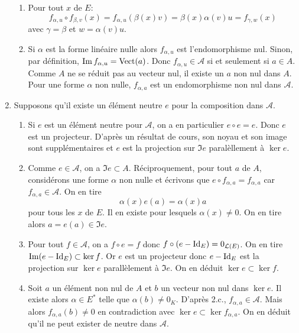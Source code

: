 \begin{enumerate}
\begin{enumerate}
 \item Pour tout $x$ de $E$:
\begin{displaymath}
 f_{\alpha, u} \circ f_{\beta, v}(x)
= f_{\alpha, u}( \beta(x) v) = \beta(x)\alpha(v) u = f_{\gamma, w}(x)
\end{displaymath}
avec $\gamma = \beta$ et $w=\alpha(v)u$.
\item Si $\alpha$ est la forme linéaire nulle alors $f_{\alpha, u}$ est l'endomorphisme nul. Sinon, par définition, $\operatorname{Im} f_{\alpha, u} = \operatorname{Vect}(a)$. Donc $f_{\alpha, u}\in\mathcal{A}$ si et seulement si $a\in A$. Comme $A$ ne se réduit pas au vecteur nul, il existe un $a$ non nul dans $A$. Pour une forme $\alpha$ non nulle, $f_{\alpha, a}$ est un endomorphisme non nul dans $\mathcal A$. 
\end{enumerate}
\item Supposons qu'il existe un élément neutre $e$ pour la composition dans $\mathcal{A}$.
\begin{enumerate}
  \item Si $e$ est un élément neutre pour $\mathcal{A}$, on a en particulier $e\circ e=e$. Donc $e$ est un projecteur. D'après un résultat de cours, son noyau et son image sont supplémentaires et $e$ est la projection sur $\Im e$ paralèllement à $\ker e$.
  \item Comme $e\in \mathcal{A}$, on a $\Im e\subset A$. Réciproquement, pour tout $a$ de $A$, considérons une forme $\alpha$ non nulle et écrivons que $e\circ f_{\alpha, a} = f_{\alpha, a}$ car $f_{\alpha, a}\in \mathcal{A}$. On en tire
\begin{displaymath}
 \alpha(x)e(a) = \alpha(x)a
\end{displaymath}
pour tous les $x$ de $E$. Il en existe pour lesquels $\alpha(x)\neq 0$. On en tire alors $a=e(a)\in \Im e$.
  \item Pour tout $f\in\mathcal{A}$, on a $f\circ e=f$ donc $f\circ(e-\operatorname{Id}_E)=0_{\mathcal{L}(E)}$. On en tire $\operatorname{Im}(e-\operatorname{Id}_E)\subset \ker f$. Or $e$ est un projecteur donc $e-\operatorname{Id}_E$ est la projection sur $\ker e$ parallèlement à $\Im e$. On en déduit $\ker e\subset \ker f$.
  \item Soit $a$ un élément non nul de $A$ et $b$ un vecteur non nul dans $\ker e$. Il existe alors $\alpha\in E^*$ telle que $\alpha(b)\neq 0_K$. D'après 2.c., $f_{\alpha, a}\in \mathcal A$. Mais alors $f_{\alpha, a}(b)\neq 0$ en contradiction avec $\ker e \subset \ker f_{\alpha, a}$.\newline
On en déduit qu'il ne peut exister de neutre dans $\mathcal A$.
\end{enumerate}

\end{enumerate}
